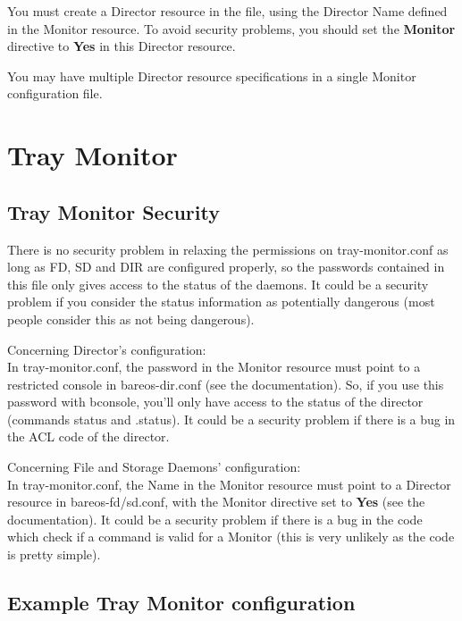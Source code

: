 You must create a Director resource in the
 file, using the
Director Name defined in the Monitor resource. To avoid security problems, you
should set the {\bf Monitor} directive to {\bf Yes} in this Director resource.

You may have multiple Director resource specifications in a single Monitor
configuration file.





\section{Tray Monitor}

\subsection*{Tray Monitor Security}

There is no security problem in relaxing the permissions on
tray-monitor.conf as long as FD, SD and DIR are configured properly, so
the passwords contained in this file only gives access to the status of
the daemons. It could be a security problem if you consider the status
information as potentially dangerous
(most people consider this as not being dangerous).

Concerning Director's configuration: \\
In tray-monitor.conf, the password in the Monitor resource must point to
a restricted console in bareos-dir.conf (see the documentation). So, if
you use this password with bconsole, you'll only have access to the
status of the director (commands status and .status).
It could be a security problem if there is a bug in the ACL code of the
director.

Concerning File and Storage Daemons' configuration:\\
In tray-monitor.conf, the Name in the Monitor resource must point to a
Director resource in bareos-fd/sd.conf, with the Monitor directive set
to {\bf Yes} (see the documentation).
It could be a security problem if there is a bug in the code which check
if a command is valid for a Monitor (this is very unlikely as the code
is pretty simple).


\subsection*{Example Tray Monitor configuration}


